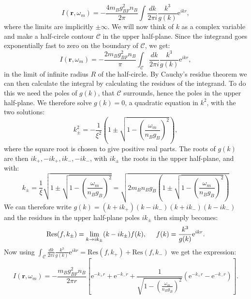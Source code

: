 \begin{equation}
I(\mathbf{r}, \omega_m) = -\frac{4m_Bg^2_{BF}n_B}{2\pi}\int \frac{dk}{2\pi i} \frac{k^3}{g(k)}\text{e}^{ikr}, \nonumber
\end{equation}
where the limits are implicitly $\pm \infty$. We will now think of $k$ as a complex variable and make a half-circle contour $\mathcal{C}$ in the upper half-plane. Since the integrand goes exponentially fast to zero on the boundary of $\mathcal{C}$, we get:
\begin{equation}
I(\mathbf{r}, \omega_m) = -\frac{2m_Bg^2_{BF}n_B}{\pi}\int_{\mathcal{C}} \frac{dk}{2\pi i} \frac{k^3}{g(k)}\text{e}^{ikr}, \nonumber
\end{equation}
in the limit of infinite radius $R$ of the half-circle. By Cauchy's residue theorem we can then calculate the integral by calculating the residues of the integrand. To do this we need the poles of $g(k)$, that $\mathcal{C}$ surrounds, hence the poles in the upper half-plane. We therefore solve $g(k) = 0$, a quadratic equation in $k^2$, with the two solutions:
\begin{equation}
k^2_{\pm} = -\frac{1}{\xi^2}\left(1 \pm \sqrt{1 - \left(\frac{\omega_m}{n_Bg_B}\right)^2}\right), \nonumber
\end{equation} 
where the square root is chosen to give positive real parts. The roots of $g(k)$ are then $ik_+, -ik_+, ik_-, -ik_-$, with $ik_{\pm}$ the roots in the upper half-plane, and with: 
\begin{equation}
k_{\pm} = \frac{1}{\xi}\sqrt{1\pm \sqrt{1 - \left(\frac{\omega_m}{n_Bg_B}\right)^2}} = \sqrt{ 2m_Bn_Bg_B\left( 1 \pm \sqrt{1 - \left(\frac{\omega_m}{n_Bg_B}\right)^2 } \right) }
\label{eq.polesVindxomegam}
\end{equation}
We can therefore write $g(k) = (k + ik_+)(k - ik_-)(k + ik_-)(k - ik_-)$ and the residues in the upper half-plane poles $ik_{\pm}$ then simply becomes:
\begin{equation}
\text{Res}(f, k_{\pm}) = \lim_{k\to ik_{\pm}} (k - ik_{\pm})f(k), \hspace{0.5cm} f(k) = \frac{k^3}{g(k)}\text{e}^{ikr}. \nonumber
\end{equation}
Now using $\int_{\mathcal{C}} \frac{dk}{2\pi i} \frac{k^3}{g(k)}\text{e}^{ikr} = \text{Res}(f, k_+) + \text{Res}(f, k_-)$ we get the expression:
\begin{equation}
I(\mathbf{r}, \omega_m) = -\frac{m_Bg^2_{BF}n_B}{2\pi r}\left[ \text{e}^{-k_+r} + \text{e}^{-k_-r} + \frac{1}{ \sqrt{1 - \left(\frac{\omega_m}{n_Bg_B}\right)^2} }\left(\text{e}^{-k_+r} - \text{e}^{-k_-r}  \right) \right]. \nonumber
\end{equation}
